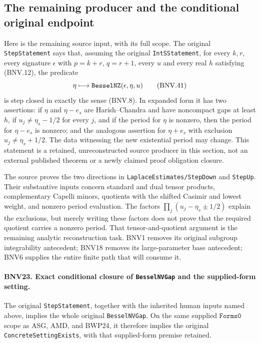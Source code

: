 \documentclass[11pt,a4paper]{article}
\numberwithin{equation}{section}
\theoremstyle{remark}\newtheorem{remark}[theorem]{Remark}
\begin{document}
\subsection{The remaining producer and the conditional original endpoint}

Here is the remaining source input, with its full scope.  The original
\texttt{Step\allowbreak Statement} says that, assuming the original
\texttt{Int\allowbreak SStatement}, for every $k,r$, every signature $\epsilon$ with
$p=k+r$, $q=r+1$, every $u$ and every real $h$ satisfying (BNV.12),
the predicate
\[
 \eta\longmapsto\texttt{Bessel\allowbreak NZ}(\epsilon,\eta,u)
 \tag{BNV.41}
\]
is step closed in exactly the sense (BNV.8).  In expanded form it has
two assertions: if $\eta$ and $\eta-e_s$ are Harish--Chandra and have
noncompact gaps at least $h$, if $u_j\ne\eta_s-1/2$ for every $j$, and
if the period for $\eta$ is nonzero, then the period for $\eta-e_s$ is
nonzero; and the analogous assertion for $\eta+e_s$ with exclusion
$u_j\ne\eta_s+1/2$.  The data witnessing the new existential period may
change.  This statement is a retained, unreconstructed source producer
in this section, not an external published theorem or a newly claimed
proof obligation closure.

The source proves the two directions in \texttt{Laplace\allowbreak Estimates/\allowbreak Step\allowbreak Down}
and \texttt{Step\allowbreak Up}.  Their substantive inputs concern standard and dual
tensor products, complementary Capelli minors, quotients with the shifted
Casimir and lowest weight, and nonzero period evaluation.  The factors
$\prod_j(u_j-\eta_s\pm1/2)$ explain the exclusions, but merely writing
these factors does not prove that the required quotient carries a
nonzero period.  That tensor-and-quotient argument is the remaining
analytic reconstruction task.  BNV1 removes its original subgroup
integrability antecedent; BNV18 removes its large-parameter base
antecedent; BNV6 supplies the entire finite path that will consume it.

\paragraph{BNV23. Exact conditional closure of \texttt{Bessel\allowbreak NVGap} and the supplied-form setting.}
\label{claim:BNV23}
The original \texttt{Step\allowbreak Statement}, together with the inherited human
inputs named above, implies the whole original \texttt{Bessel\allowbreak NVGap}.
On the same supplied $\texttt{Forms0}$ scope as ASG, AMD, and BWP24, it
therefore implies the original \texttt{Concrete\allowbreak Setting\allowbreak Exists}, with
that supplied-form premise retained.
\end{document}
